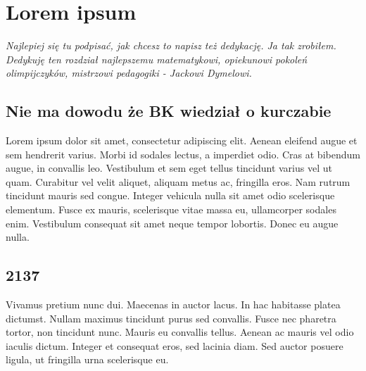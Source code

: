 \renewcommand{\autor}{Koguś Brasz}
\chapter{Lorem ipsum}
\textit{Najlepiej się tu podpisać, jak chcesz to napisz też dedykację. Ja tak zrobiłem. Dedykuję ten rozdział najlepszemu matematykowi, opiekunowi pokoleń olimpijczyków, mistrzowi pedagogiki - Jackowi Dymelowi.}
\section{Nie ma dowodu że BK wiedział o kurczabie}
Lorem ipsum dolor sit amet, consectetur adipiscing elit. Aenean eleifend augue et sem hendrerit varius. Morbi id sodales lectus, a imperdiet odio. Cras at bibendum augue, in convallis leo. Vestibulum et sem eget tellus tincidunt varius vel ut quam. Curabitur vel velit aliquet, aliquam metus ac, fringilla eros. Nam rutrum tincidunt mauris sed congue. Integer vehicula nulla sit amet odio scelerisque elementum. Fusce ex mauris, scelerisque vitae massa eu, ullamcorper sodales enim. Vestibulum consequat sit amet neque tempor lobortis. Donec eu augue nulla.
\section{2137}
Vivamus pretium nunc dui. Maecenas in auctor lacus. In hac habitasse platea dictumst. Nullam maximus tincidunt purus sed convallis. Fusce nec pharetra tortor, non tincidunt nunc. Mauris eu convallis tellus. Aenean ac mauris vel odio iaculis dictum. Integer et consequat eros, sed lacinia diam. Sed auctor posuere ligula, ut fringilla urna scelerisque eu.
